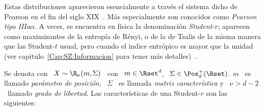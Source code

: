 \label{Sssec:MP:StudentR}

Estas distribuciones  aparecieron esencialmente a  trav\'es el sistema  dicho de
Pearson en el fin del siglo XIX~\cite{Pea95, JohKot95:v1, JohKot95:v1, KotBal00,
  FanKot90}.   M\'as   especialmente  son  conocidos  como   {\em  Pearson  tipo
  IIIa$\alpha$}.   A veces,  se  encuentra en  f\'isica  la denominaci\'on  {\em
  Student-$r$}; aparecen como maximizantes de  la entrop\'ia de R\'enyi, o de la
de Tsalis  de la misma manera que  las Student-$t$ usual, pero  cuando el indice
entr\'opico es  mayor que la unidad  (ver capitulo~\ref{Cap:SZ:Informacion} para
tener m\'as detalles)~\cite{JohVig07, CosHer03, VigHer04, Tsa88, Tsa99}.

Se denota con \ $X \sim \R_\nu(m,\Sigma)$ \ con \ $m \in \Rset^d$, \ $\Sigma \in
\Pos_d^+(\Rset)$. $m$ \ es llamado  {\em par\'ametro de posici\'on}, \ $\Sigma$
  \ es  llamada {\em matriz  caracter\'istica} y \  $\nu > d-2$ \  llamado {\em
  grado  de  libertad}.   Las  caracter\'isticas  de una  Student-$r$  son  las
siguientes:
%
